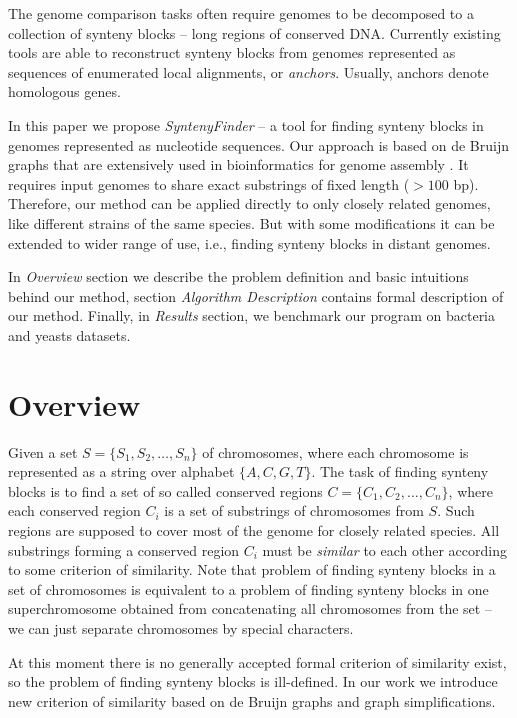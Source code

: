 \documentclass[a4paper, 12pt]{scrartcl}
\begin{document}
The genome comparison tasks often require genomes to be  decomposed to a collection of synteny blocks -- long regions of conserved DNA. Currently existing tools
\cite{Pham2010} are able to reconstruct synteny blocks from genomes represented as sequences of enumerated local alignments, or \textit{anchors}.
Usually, anchors denote homologous genes.

In this paper we propose \textit{SyntenyFinder} -- a tool for finding synteny blocks in genomes represented as nucleotide sequences.
Our approach is based on de Bruijn graphs that are extensively used in bioinformatics for genome assembly \cite{Pevzner2001, Iqbal2012}. 
It requires input genomes to share exact substrings of fixed length (\(> 100\) bp). Therefore, our method can be applied directly to only
closely related genomes, like different strains of the same species. But with some modifications it can be extended to wider range of use, i.e., 
finding synteny blocks in distant genomes.

In \textit{Overview} section we describe the problem definition and basic intuitions behind our method, section \textit{Algorithm Description}
contains formal description of our method. Finally, in \textit{Results} section, we benchmark our program on bacteria and yeasts datasets.

\section{Overview}

Given a set \(S = \lbrace S_{1}, S_{2}, \ldots, S_{n} \rbrace \) of chromosomes, where each
chromosome is represented as a string over alphabet \(\lbrace A, C, G, T \rbrace \). The task of finding synteny
blocks is to find a set of so called conserved regions \(C = \lbrace C_{1}, C_{2}, \ldots , C_{n} \rbrace \), where
each conserved region \(C_{i}\) is a set of substrings of chromosomes from \(S\). Such regions are supposed 
to cover most of the genome for closely related species.  All substrings forming a conserved region \(C_{i}\) must be
\textit{similar} to each other according to some criterion of similarity. Note that problem of finding synteny blocks in a set
of chromosomes is equivalent to a problem of finding synteny blocks in one superchromosome
obtained from concatenating all chromosomes from the set -- we can just separate chromosomes by special characters.

At this moment there is no generally accepted formal criterion of similarity exist, so the problem of finding synteny blocks is ill-defined.
In our work we introduce new criterion of similarity based on de Bruijn graphs and graph simplifications.
\end{document}
